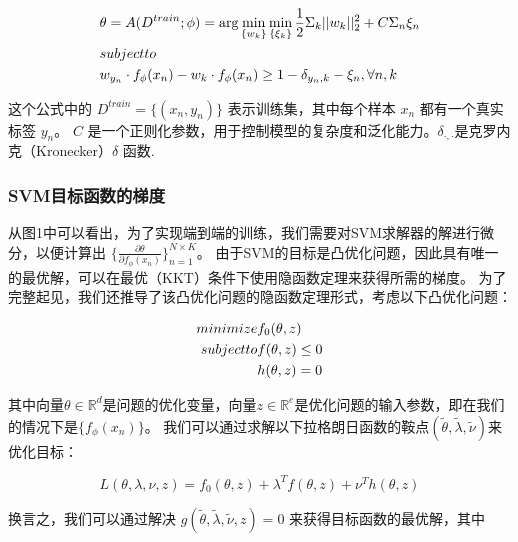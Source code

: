 \begin{equation}
\begin{aligned}
   & \theta = A(D^{train}; \phi) = \arg \min_{\{w_k\}}\min_{\{\xi_k\}}\frac{1}{2}\Sigma_k||w_k||_2^2 + C \Sigma_n \xi_n\\
   & subject \space to \\
   & w_{y_n} \cdot f_{\phi}(x_n)-w_k \cdot f_\phi (x_n) \ge 1 - \delta_{y_n,k} - \xi_n, \forall n, k\\
\end{aligned}
\end{equation}

这个公式中的 $D^{train} = \{(x_n, y_n)\}$ 表示训练集，其中每个样本 $x_n$ 都有一个真实标签 $y_n$。
$C$ 是一个正则化参数，用于控制模型的复杂度和泛化能力。$δ_{·,·}$是克罗内克（Kronecker）$δ$ 函数.

\subsubsection{SVM目标函数的梯度}

从图1中可以看出，为了实现端到端的训练，我们需要对SVM求解器的解进行微分，以便计算出
$\{\frac{\partial\theta}{\partial f_\phi(x_n)}\}^{N \times K}_{n=1}$。
由于SVM的目标是凸优化问题，因此具有唯一的最优解，可以在最优（KKT）条件下使用隐函数定理来获得所需的梯度。
为了完整起见，我们还推导了该凸优化问题的隐函数定理形式，考虑以下凸优化问题：

\begin{equation}
    \begin{aligned}
        minimize\space &f_0(\theta, z)\\
        subject\space to &f(\theta, z) \le 0\\
        &h(\theta, z)=0\\
    \end{aligned}
\end{equation}

其中向量$\theta \in \mathbb{R}^d$是问题的优化变量，向量$z \in \mathbb{R}^e$是优化问题的输入参数，即在我们的情况下是$\{f_\phi(x_n)\}$。
我们可以通过求解以下拉格朗日函数的鞍点$(\tilde{\theta}, \tilde{\lambda}, \tilde{\nu})$来优化目标：

\begin{equation}
    L(\theta, \lambda, \nu, z) = f_0(\theta, z) + \lambda^{T} f(\theta, z) + \nu^Th(\theta, z)
\end{equation}

换言之，我们可以通过解决 $g(\tilde{\theta}, \tilde{\lambda}, \tilde{\nu}, z  ) = 0$ 来获得目标函数的最优解，其中

